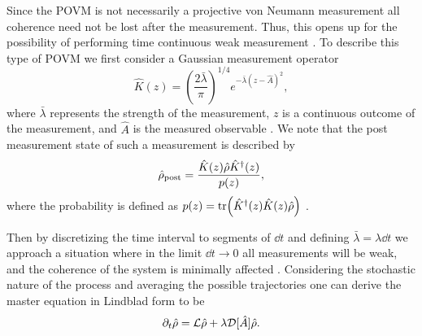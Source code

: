 Since the POVM is not necessarily a projective von Neumann measurement all coherence need not be lost after the measurement. Thus, this opens up for the possibility of performing time continuous weak measurement \cite{Annby-Andersson:2024}. To describe this type of POVM we first consider a Gaussian measurement operator
\begin{equation}
    \hat{K}(z) = \left(\frac{2 \bar{\lambda}}{\pi}\right)^{1/4} e^{-\bar{\lambda}(z - \hat{A})^2},
\end{equation}
where $\bar{\lambda}$ represents the strength of the measurement, $z$ is a continuous outcome of the measurement, and $\hat{A}$ is the measured observable \cite{Annby-Andersson:2024}. We note that the post measurement state of such a measurement is described by
\begin{equation}
    \hat{\rho}_\mathrm{post} =  \frac{\hat{K}(z) \hat{\rho} \hat{K}^\dagger(z)}{p(z)},
\end{equation}
where the probability is defined as $p(z) = \tr( \hat{K}^\dagger(z) \hat{K}(z) \hat{\rho} )$ \cite{Annby-Andersson:2024}.

Then by discretizing the time interval to segments of $\dd t$ and defining $\bar{\lambda} = \lambda \dd t$ we approach a situation where in the limit $\dd t \to 0$ all measurements will be weak, and the coherence of the system is minimally affected \cite{Annby-Andersson:2024}. Considering the stochastic nature of the process and averaging the possible trajectories one can derive the master equation \cite{Annby-Andersson:2024} in Lindblad form to be 
\begin{equation}
    \partial_t\hat{\rho} = \mathcal{L}\hat{\rho} + \lambda \mathcal{D}[\hat{A}] \hat{\rho}. \label{eq:masterMeas}
\end{equation}

